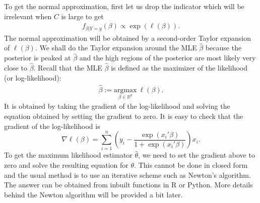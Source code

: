 \documentclass{scrartcl}
\newcommand{\R}{{\mathbb R}}
\begin{document}
To get the normal approximation, first let us drop the
indicator which will be irrelevant when $C$ is large to get
\begin{align*}
  f_{\beta | Y = y}(\beta) \propto \exp(\ell(\beta)). 
\end{align*}
The normal approximation will be obtained by a second-order Taylor
expansion of $\ell(\beta)$. We shall do the Taylor expansion around
the MLE $\hat{\beta}$ because the posterior is peaked at $\hat{\beta}$
and the high regions of the posterior are most likely very close to
$\hat{\beta}$. Recall that the MLE $\hat{\beta}$ is defined as the
maximizer of the likelihood (or log-likelihood):
\begin{align*}
  \hat{\beta} := \underset{\beta \in \R^p}{\text{argmax}} ~
  \ell(\beta). 
\end{align*}
It is obtained by taking the gradient of the log-likelihood and
solving the equation obtained by setting the gradient to zero. It is
easy to check that the gradient of the log-likelihood is
\begin{equation}\label{grad1}
  \nabla \ell(\beta) = \sum_{i=1}^n \left(y_i - \frac{\exp
        \left(x_i'\beta \right)}{1 + \exp \left(x_i'\beta \right)}
    \right) x_i. 
  \end{equation}
  To get the maximum likelihood estimator $\hat{\theta}$, we need to
  set the gradient above to zero and solve the resulting equation for
  $\theta$. This cannot be done in closed form and the usual method is
  to use an iterative scheme such as Newton's algorithm. The answer
  can be obtained from inbuilt functions in R or Python. More details
  behind the Newton algorithm will be provided a bit later. 
\end{document}
